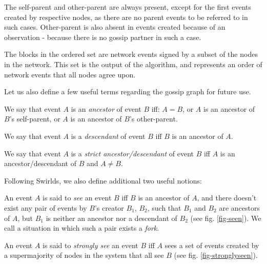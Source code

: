 \documentclass[a4paper,fleqn]{article}
\begin{document}
The self-parent and other-parent are always present, except for the first events created by
respective nodes, as there are no parent events to be referred to in such cases. Other-parent is
also absent in events created because of an observation - because there is no gossip partner in
such a case.

The blocks in the ordered set are network events signed by a subset of the nodes in the network.
This set is the output of the algorithm, and represents an order of network events that all nodes
agree upon.

Let us also define a few useful terms regarding the gossip graph for future use.

\begin{defn}
	We say that event $A$ is an \emph{ancestor} of event $B$ iff: $A = B$, or $A$ is an ancestor of
	$B$'s self-parent, or $A$ is an ancestor of $B$'s other-parent.
\end{defn}

\begin{defn}
	We say that event $A$ is a \emph{descendant} of event $B$ iff $B$ is an ancestor of $A$.
\end{defn}

\begin{defn}
	We say that event $A$ is a \emph{strict ancestor/descendant} of event $B$ iff $A$ is an
	ancestor/descendant of $B$ and $A \neq B$.
\end{defn}

Following Swirlds\cite{hg}, we also define additional two useful notions:

\begin{defn}
	An event $A$ is said to \emph{see} an event $B$ iff $B$ is an ancestor of $A$, and there
	doesn't exist any pair of events by $B$'s creator $B_1$, $B_2$, such that $B_1$ and $B_2$ are
	ancestors of $A$, but $B_1$ is neither an ancestor nor a descendant of $B_2$ (see fig.
	\ref{fig-seen}). We call a situation in which such a pair exists a \emph{fork}.
\end{defn}

\begin{defn}
	An event $A$ is said to \emph{strongly see} an event $B$ iff $A$ sees a set of events created
	by a supermajority of nodes in the system that all see $B$ (see fig. \ref{fig-stronglyseen}).
\end{defn}
\end{document}
